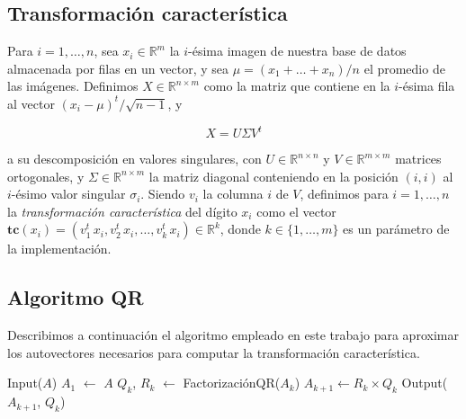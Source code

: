 \documentclass[a4paper,10pt,twoside]{article}
\newcommand{\real}{\mathbb{R}}
\begin{document}
\subsection{Transformación característica}

Para $i = 1,\ldots, n$, sea $x_i \in \real^{m}$ la $i$-\'esima imagen de nuestra base de datos almacenada por filas en un vector, y sea $\mu = (x_1 + \ldots + x_n)/n$ el promedio de las im\'agenes. Definimos $X\in\real^{n\times m}$ como la matriz que contiene en la $i$-\'esima fila al vector $(x_i - \mu)^{t}/\sqrt{n-1}$, y

$$X=U \Sigma V^t$$

a su descomposici\'on en valores singulares, con $U\in\real^{n\times n}$ y $V\in\real^{m\times m}$ matrices ortogonales, y $\Sigma\in\real^{n\times m}$ la matriz diagonal conteniendo en la posici\'on $(i,i)$ al $i$-\'esimo valor singular $\sigma_i$.
Siendo $v_i$ la columna $i$ de $V$, definimos para $i = 1,\ldots,n$ la \textsl{transformaci\'on caracter\'istica} del d\'igito $x_{i}$ como el vector $\mathbf{tc}(x_i) = (v_1^t\, x_i, v_2^t\, x_i,\ldots,v_k^t\, x_i) \in\real^k$, donde $k \in\{1,\ldots,m\}$ es un par\'ametro de la implementaci\'on.


\subsection{Algoritmo QR}

Describimos a continuación el algoritmo empleado en este trabajo para aproximar los autovectores necesarios para computar la transformación característica.

\begin{algorithmic}
  \STATE Input($A$)
  \STATE $A_1$ $\leftarrow$ $A$
    \STATE $Q_k$, $R_k$ $\leftarrow$ FactorizaciónQR($A_k$)
    \STATE $A_{k+1} \leftarrow R_k \times Q_k$
  \ENDWHILE
  \STATE Output($A_{k+1}$, $Q_k$)
\end{algorithmic}




\end{document}
